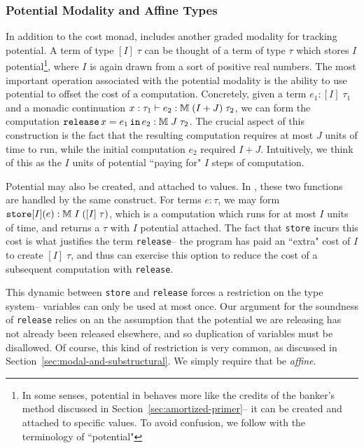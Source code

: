 \subsubsection{Potential Modality and Affine Types}
In addition to the cost monad, \lambdaamor includes another graded modality for tracking potential. A term of type $[I] \; \tau$ can be thought of a term of type $\tau$ which stores $I$ potential\footnote{
In some senses, potential in \lambdaamor behaves more like the credits of the banker's method discussed in Section~\ref{sec:amortized-primer}-- it can be created and attached to specific values. To avoid confusion, we follow \citet{rajani-et-al:popl21} with the terminology of ``potential"
}, where $I$ is again drawn from a sort of positive real numbers.
The most important operation associated with the potential modality is the ability to use potential to offset the cost of a computation. Concretely, given a term $e_1 : [I] \; \tau_1$ and a monadic continuation $x : \tau_1 \vdash e_2 : \mathbb{M} \; (I + J) \; \tau_2$, we can form the computation $\texttt{release}\, x = e_1 \, \texttt{in}\, e_2 : \mathbb{M} \; J \; \tau_2$. The crucial aspect of this construction is the fact that the resulting computation requires at most $J$ units of time to run, while the initial computation $e_2$ required $I + J$. Intuitively, we think of this as the $I$ units of potential ``paying for" $I$ steps of computation. 

Potential may also be created, and attached to values. In \lambdaamor, these two functions are handled by the same construct. For terms $e : \tau$, we may form $\texttt{store}[I](e) : \mathbb{M} \; I \; ([I] \; \tau)$, which is a computation which runs for at most $I$ units of time, and returns a $\tau$ with $I$ potential attached. The fact that \texttt{store} incurs this cost is what justifies the term \texttt{release}-- the program has paid an ``extra" cost of $I$ to create $[I] \; \tau$, and thus can exercise this option to reduce the cost of a subsequent computation with \texttt{release}.

This dynamic between \texttt{store} and \texttt{release} forces a restriction on the type system-- variables can only be used at most once. Our argument for the soundness of \texttt{release} relies on an the assumption that the potential we are releasing has not already been released elsewhere, and so duplication of variables must be disallowed. Of course, this kind of restriction is very common, as discussed in Section~\ref{sec:modal-and-substructural}. We simply require that \lambdaamor be \textit{affine}.


